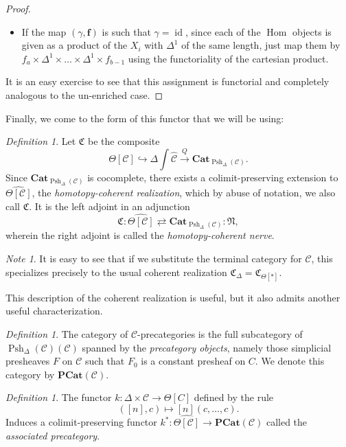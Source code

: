 \documentclass[leqno]{article}
\numberwithin{equation}{subsection}
\theoremstyle{plain}   %
\theoremstyle{remark}
\newtheorem{note}[equation]{Note}
\newtheorem{defn}[equation]{Definition}
\theoremstyle{plain}
\DeclareMathOperator{\id}{id}
\newcommand{\Cat}{\ensuremath{\mathbf{Cat}}}
\DeclareMathOperator{\Hom}{Hom}
\newcommand{\psh}[1]{\ensuremath{\widehat{#1}}}
\newcommand{\C}{\ensuremath{\mathcal{C}}}
\newcommand{\cellset}{\ensuremath{\widehat{\Theta[\mathcal{C}]}}}
\newcommand{\spsh}{\ensuremath{\operatorname{Psh}_\Delta(\mathcal{C})}}
\begin{document}
\begin{proof}
\begin{itemize}
		\item If the map \((\gamma,\mathbf{f})\) is such that \(\gamma=\id\), since each of the \(\Hom\) objects is given as a product of the \(X_i\) with \(\Delta^1\) of the same length, just map them by \(f_a\times\Delta^1\times \dots \times\Delta^1 \times f_{b-1}\) using the functoriality of the cartesian product.
	\end{itemize}
	It is an easy exercise to see that this assignment is functorial and completely analogous to the un-enriched case.
\end{proof}

Finally, we come to the form of this functor that we will be using:

\begin{defn} Let \(\mathfrak{C}\) be the composite \[\Theta[\C]\hookrightarrow\Delta\int \psh{\C} \xrightarrow{Q} \Cat_{\spsh}.\] Since \(\Cat_{\spsh}\) is cocomplete, there exists a colimit-preserving extension to \(\cellset\), the \emph{homotopy-coherent realization}, which by abuse of notation, we also call \(\mathfrak{C}\).  It is the left adjoint in an adjunction \[\mathfrak{C}:\cellset\rightleftarrows \Cat_{\spsh}:\mathfrak{N},\]  wherein the right adjoint is called the \emph{homotopy-coherent nerve}.
\end{defn}

\begin{note}
	It is easy to see that if we substitute the terminal category for \(\C\), this specializes precisely to the usual coherent realization \(\mathfrak{C}_{\Delta} = \mathfrak{C}_{\Theta[\ast]}\).  
\end{note}

This description of the coherent realization is useful, but it also admits another useful characterization.

\begin{defn} 
	The category of \(\C\)-precategories is the full subcategory of \(\spsh(\C)\) spanned by the \emph{precategory objects}, namely those simplicial presheaves \(F\) on \(\C\) such that \(F_0\) is a constant presheaf on \(C\).  We denote this category by \(\mathbf{PCat}(\C)\). 
\end{defn}

\begin{defn}
	The functor \(k: \Delta \times \C\to \Theta[C]\) defined by the rule 
	\[
		([n],c) \mapsto [n](c,\dots,c).
	\]
	Induces a colimit-preserving functor \(k^\ast: \cellset \to \mathbf{PCat}(\C)\) called the \emph{associated precategory}.
\end{defn}
\end{document}
